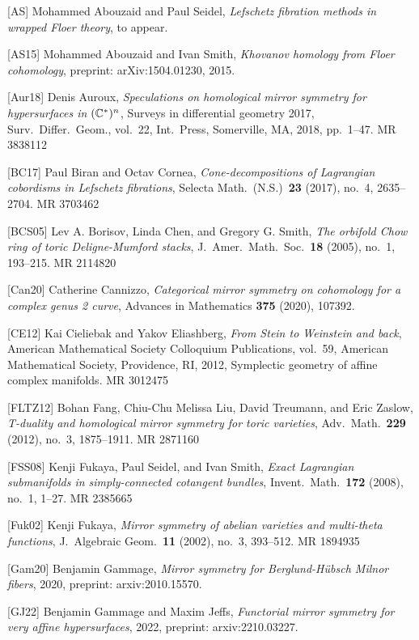 [AS] Mohammed Abouzaid and Paul Seidel, \emph{Lefschetz fibration methods in wrapped
Floer theory}, to appear.

[AS15] Mohammed Abouzaid and Ivan Smith, \emph{Khovanov homology from Floer
cohomology}, preprint: arXiv:1504.01230, 2015.

[Aur18] Denis Auroux, \emph{Speculations on homological mirror symmetry for
hypersurfaces in $(\mathbb{C}^*)^n$}, Surveys in differential geometry 2017, Surv.\ Differ.\
Geom., vol.~22, Int.\ Press, Somerville, MA, 2018, pp.~1--47. MR 3838112

[BC17] Paul Biran and Octav Cornea, \emph{Cone-decompositions of Lagrangian cobordisms
in Lefschetz fibrations}, Selecta Math.\ (N.S.)\ \textbf{23} (2017), no.~4,
2635--2704. MR 3703462

[BCS05] Lev A. Borisov, Linda Chen, and Gregory G. Smith, \emph{The orbifold Chow ring
of toric Deligne-Mumford stacks}, J.\ Amer.\ Math.\ Soc.\ \textbf{18} (2005), no.~1,
193--215. MR 2114820

[Can20] Catherine Cannizzo, \emph{Categorical mirror symmetry on cohomology for a
complex genus 2 curve}, Advances in Mathematics \textbf{375} (2020), 107392.

[CE12] Kai Cieliebak and Yakov Eliashberg, \emph{From Stein to Weinstein and back},
American Mathematical Society Colloquium Publications, vol.~59, American Mathematical
Society, Providence, RI, 2012, Symplectic geometry of affine complex manifolds.
MR 3012475

[FLTZ12] Bohan Fang, Chiu-Chu Melissa Liu, David Treumann, and Eric Zaslow,
\emph{T-duality and homological mirror symmetry for toric varieties}, Adv.\ Math.\
\textbf{229} (2012), no.~3, 1875--1911. MR 2871160

[FSS08] Kenji Fukaya, Paul Seidel, and Ivan Smith, \emph{Exact Lagrangian submanifolds
in simply-connected cotangent bundles}, Invent.\ Math.\ \textbf{172} (2008), no.~1,
1--27. MR 2385665


[Fuk02] Kenji Fukaya, \emph{Mirror symmetry of abelian varieties and multi-theta
functions}, J.\ Algebraic Geom.\ \textbf{11} (2002), no.~3, 393--512. MR 1894935

[Gam20] Benjamin Gammage, \emph{Mirror symmetry for Berglund-H{\"u}bsch Milnor fibers},
2020, preprint: arxiv:2010.15570.

[GJ22] Benjamin Gammage and Maxim Jeffs, \emph{Functorial mirror symmetry for very
affine hypersurfaces}, 2022, preprint: arxiv:2210.03227.

